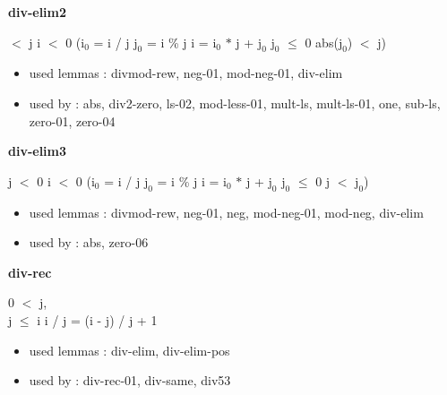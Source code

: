 \documentclass[a4paper]{article}
\begin{document}
\medskip

\bigskip

{\large\bf div-elim2}

\medskip

  $<$ j \And i $<$ 0 \Imp ($\mbox{i}_{0}$ = i / j \And $\mbox{j}_{0}$ = i \% j \Equiv i = $\mbox{i}_{0}$ $*$ j + $\mbox{j}_{0}$ \And $\mbox{j}_{0}$ $\le$ 0 \And abs($\mbox{j}_{0}$) $<$ j)

\begin{itemize}


\item       used lemmas  : divmod-rew, neg-01, mod-neg-01, div-elim
\item       used by      : abs, div2-zero, ls-02, mod-less-01, mult-ls, mult-ls-01, one, sub-ls, zero-01, zero-04

\end{itemize}

\medskip

\bigskip

{\large\bf div-elim3}

\medskip

 \Fol j $<$ 0 \And i $<$ 0 \Imp ($\mbox{i}_{0}$ = i / j \And $\mbox{j}_{0}$ = i \% j \Equiv i = $\mbox{i}_{0}$ $*$ j + $\mbox{j}_{0}$ \And $\mbox{j}_{0}$ $\le$ 0 \And j $<$ $\mbox{j}_{0}$)

\begin{itemize}


\item       used lemmas  : divmod-rew, neg-01, neg, mod-neg-01, mod-neg, div-elim
\item       used by      : abs, zero-06

\end{itemize}

\medskip

\bigskip

{\large\bf div-rec}

\medskip

0 $<$ j, \\
j $\le$ i \Fol i / j = (i - j) / j + 1

\begin{itemize}


\item       used lemmas  : div-elim, div-elim-pos
\item       used by      : div-rec-01, div-same, div53

\end{itemize}

\medskip
\end{document}
